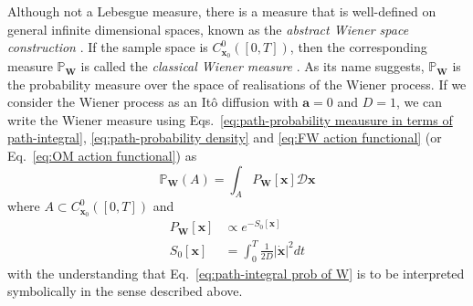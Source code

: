 Although not a Lebesgue measure, there is a measure that is well-defined on general infinite dimensional spaces, known as the \textit{abstract Wiener space construction} \citep{grossAbstractWienerSpaces1967, MeasureIntegrationTheory1972}. If the sample space is $C_{\mathbf{x}_0}^0([0,T])$, then the corresponding measure $\mathbb{P}_\mathbf{W}$ is called the \textit{classical Wiener measure} \citep{cameronTransformationsWeinerIntegrals1944b, cameronTransformationsWienerIntegrals1945a}. As its name suggests, $\mathbb{P}_\mathbf{W}$ is the probability measure over the space of realisations of the Wiener process. If we consider the Wiener process as an It\^{o} diffusion with $\mathbf{a} = 0$ and $D=1$, we can write the Wiener measure using Eqs.~\ref{eq:path-probability meausure in terms of path-integral}, \ref{eq:path-probability density} and \ref{eq:FW action functional} (or Eq.~\ref{eq:OM action functional}) as
\begin{equation} \label{eq:path-integral prob of W}
\mathbb{P}_\mathbf{W}(A) = \int_A P_\mathbf{W}[\mathbf{x}] \mathcal{D} \mathbf{x}
\end{equation}
where $A \subset C_{\mathbf{x}_0}^0([0,T])$ and
\begin{subequations}
\begin{align}
P_\mathbf{W}[\mathbf{x}] & \propto e^{- S_0[\mathbf{x}] } \\
S_0[\mathbf{x}] & = \int_0^T \frac{1}{2D} |\dot{\mathbf{x}}|^2 dt
\end{align}
\end{subequations}
with the understanding that Eq.~\ref{eq:path-integral prob of W} is to be interpreted symbolically in the sense described above.

